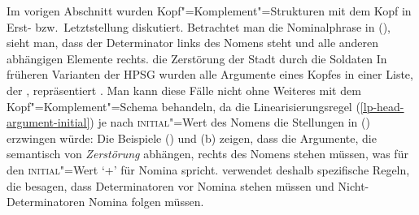 Im vorigen Abschnitt wurden Kopf"=Komplement"=Strukturen mit dem Kopf in Erst-
bzw.\ Letztstellung diskutiert. Betrachtet man die Nominalphrase in (),
sieht man, dass der Determinator links des Nomens steht und alle anderen abhängigen
Elemente rechts.
\ea
\label{ex-die-Zerstörung-der-Stadt-dds}
die Zerstörung der Stadt durch die Soldaten
\z
In früheren Varianten der HPSG wurden alle Argumente eines Kopfes in einer Liste, der \subcatl,
repräsentiert \parencites[Kapitel~1--8]{ps2}[Abschnitt~2.2]{Mueller99a}.
Man kann diese Fälle nicht ohne Weiteres mit dem Kopf"=Komplement"=Schema behandeln, da die Linearisierungsregel
(\ref{lp-head-argument-initial}) je nach \textsc{initial}"=Wert des Nomens die Stellungen in ()
erzwingen würde:
\eal
{}
\zl
Die Beispiele () und (b) zeigen, dass die Argumente, die semantisch von \emph{Zerstörung} abhängen, rechts des
Nomens stehen müssen, was für den \textsc{initial}"=Wert `+' für Nomina spricht. \citet[--165]{Mueller99a} verwendet deshalb spezifische Regeln, die besagen, dass Determinatoren vor Nomina
stehen müssen und Nicht-Determinatoren Nomina folgen müssen.

